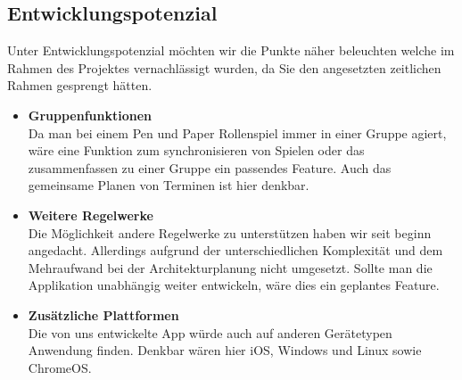 \subsection{Entwicklungspotenzial}
Unter Entwicklungspotenzial möchten wir die Punkte näher beleuchten welche im Rahmen des Projektes vernachlässigt wurden, da Sie den angesetzten zeitlichen Rahmen gesprengt hätten.\\
\begin{itemize}
	\item \textbf{Gruppenfunktionen}\\
	Da man bei einem Pen und Paper Rollenspiel immer in einer Gruppe agiert, wäre eine Funktion zum synchronisieren von Spielen oder das zusammenfassen zu einer Gruppe ein passendes Feature. Auch das gemeinsame Planen von Terminen ist hier denkbar.
	\item \textbf{Weitere Regelwerke}\\
	Die Möglichkeit andere Regelwerke zu unterstützen haben wir seit beginn angedacht. Allerdings aufgrund der unterschiedlichen Komplexität und dem Mehraufwand bei der Architekturplanung nicht umgesetzt. Sollte man die Applikation unabhängig weiter entwickeln, wäre dies ein geplantes Feature.
	\item \textbf{Zusätzliche Plattformen}\\
	Die von uns entwickelte App würde auch auf anderen Gerätetypen Anwendung finden. Denkbar wären hier iOS, Windows und Linux sowie ChromeOS.
\end{itemize}

